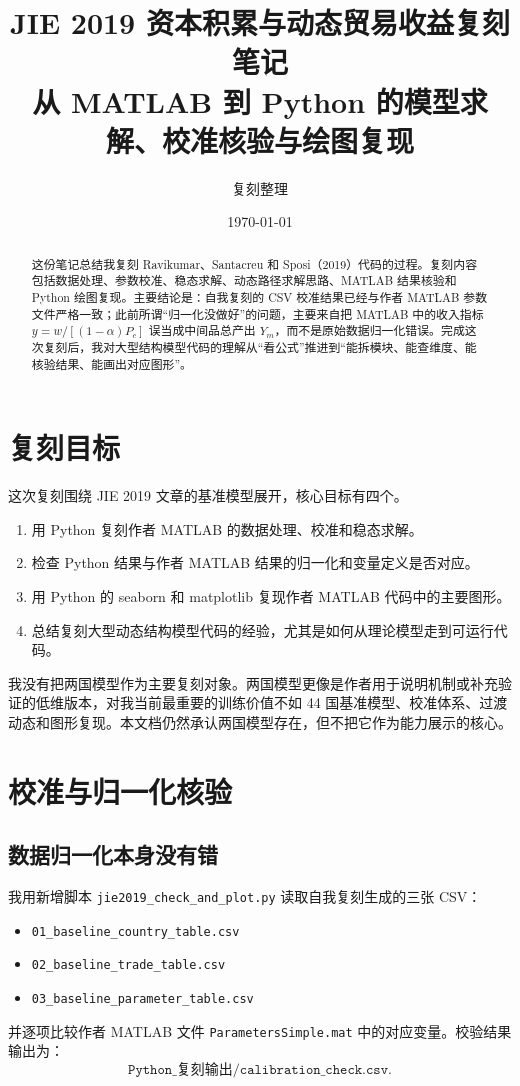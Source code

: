 \documentclass[UTF8,12pt,a4paper]{ctexart}
\title{\textbf{JIE 2019 资本积累与动态贸易收益复刻笔记}\\
\large 从 MATLAB 到 Python 的模型求解、校准核验与绘图复现}
\author{复刻整理}
\date{\today}
\begin{document}
\maketitle

\begin{abstract}
这份笔记总结我复刻 Ravikumar、Santacreu 和 Sposi（2019）代码的过程。复刻内容包括数据处理、参数校准、稳态求解、动态路径求解思路、MATLAB 结果核验和 Python 绘图复现。主要结论是：自我复刻的 CSV 校准结果已经与作者 MATLAB 参数文件严格一致；此前所谓“归一化没做好”的问题，主要来自把 MATLAB 中的收入指标 $y=w/[(1-\alpha)P_c]$ 误当成中间品总产出 $Y_m$，而不是原始数据归一化错误。完成这次复刻后，我对大型结构模型代码的理解从“看公式”推进到“能拆模块、能查维度、能核验结果、能画出对应图形”。
\end{abstract}

\tableofcontents
\newpage

\section{复刻目标}

这次复刻围绕 JIE 2019 文章的基准模型展开，核心目标有四个。

\begin{enumerate}
  \item 用 Python 复刻作者 MATLAB 的数据处理、校准和稳态求解。
  \item 检查 Python 结果与作者 MATLAB 结果的归一化和变量定义是否对应。
  \item 用 Python 的 seaborn 和 matplotlib 复现作者 MATLAB 代码中的主要图形。
  \item 总结复刻大型动态结构模型代码的经验，尤其是如何从理论模型走到可运行代码。
\end{enumerate}

我没有把两国模型作为主要复刻对象。两国模型更像是作者用于说明机制或补充验证的低维版本，对我当前最重要的训练价值不如 44 国基准模型、校准体系、过渡动态和图形复现。本文档仍然承认两国模型存在，但不把它作为能力展示的核心。

\section{校准与归一化核验}

\subsection{数据归一化本身没有错}

我用新增脚本 \texttt{jie2019\_check\_and\_plot.py} 读取自我复刻生成的三张 CSV：
\begin{itemize}
  \item \texttt{01\_baseline\_country\_table.csv}
  \item \texttt{02\_baseline\_trade\_table.csv}
  \item \texttt{03\_baseline\_parameter\_table.csv}
\end{itemize}
并逐项比较作者 MATLAB 文件 \texttt{ParametersSimple.mat} 中的对应变量。校验结果输出为：
\[
\texttt{Python\_复刻输出/calibration\_check.csv}.
\]
\end{document}
